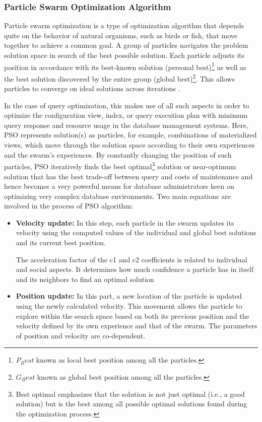 \subsubsection{Particle Swarm Optimization Algorithm}
Particle swarm optimization is a type of optimization algorithm that depends quite on the behavior of natural organisms, such as birds or fish, that move together to achieve a common goal. A group of particles navigates the problem solution space in search of the best possible solution. Each particle adjusts its position in accordance with its best-known solution (personal best)\footnote{$P_Best$ known as local best position among all the particles.} as well as the best solution discovered by the entire group (global best)\footnote{$G_Best$ known as global best position among all the particles.}. This allows particles to converge on ideal solutions across iterations \cite{subhasis-2023}.\vspace{.4cm}

 In the case of query optimization, this makes use of all such aspects in order to optimize the configuration view, index, or query execution plan with minimum query response and resource usage in the database management systems. Here, PSO represents solution(s) as particles, for example, combinations of materialized views, which move through the solution space according to their own experiences and the swarm's experiences. By constantly changing the position of such particles, PSO iteratively finds the best optimal\footnote{Best optimal emphasizes that the solution is not just optimal (i.e., a good solution) but is the best among all possible optimal solutions found during the optimization process.} solution or near-optimum solution that has the best trade-off between query and costs of maintenance and hence becomes a very powerful means for database administrators keen on optimizing very complex database environments. Two main equations are involved in the process of PSO algorithm:\vspace{.4cm}
\begin{itemize}
    \item \textbf{Velocity update:} In this step, each particle in the swarm updates its velocity using the computed values of the individual and global best solutions and its current best position. 


    The acceleration factor of the c1 and c2 coefficients is related to individual and social aspects. It determines how much confidence a particle has in itself and its neighbors to find an optimal solution \cite{baeldung2024pso}
    
    \item \textbf{Position update:} In this part, a new location of the particle is updated using the newly calculated velocity. This movement allows the particle to explore within the search space based on both its previous position and the velocity defined by its own experience and that of the swarm. The parameters of position and velocity are co-dependent.
    
    

\end{itemize} 

